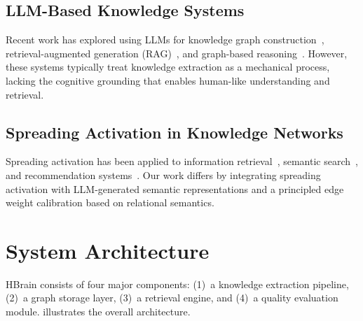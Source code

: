 \documentclass[11pt]{article}
\begin{document}
\subsection{LLM-Based Knowledge Systems}

Recent work has explored using LLMs for knowledge graph construction~\cite{pan2024unifying}, retrieval-augmented generation (RAG)~\cite{lewis2020retrieval}, and graph-based reasoning~\cite{edge2024local}. However, these systems typically treat knowledge extraction as a mechanical process, lacking the cognitive grounding that enables human-like understanding and retrieval.

\subsection{Spreading Activation in Knowledge Networks}

Spreading activation has been applied to information retrieval~\cite{crestani1997application}, semantic search~\cite{hwang2019semantic}, and recommendation systems~\cite{symeonidis2008recommendation}. Our work differs by integrating spreading activation with LLM-generated semantic representations and a principled edge weight calibration based on relational semantics.

\section{System Architecture}
\label{sec:architecture}

HBrain consists of four major components: (1)~a knowledge extraction pipeline, (2)~a graph storage layer, (3)~a retrieval engine, and (4)~a quality evaluation module.  illustrates the overall architecture.
\end{document}
